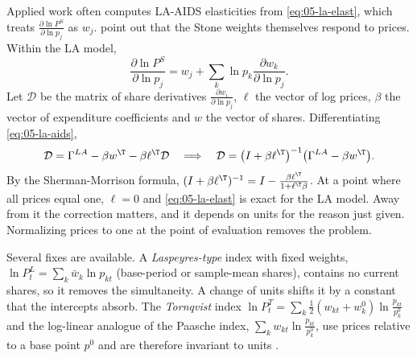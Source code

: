 Applied work often computes LA-AIDS elasticities from \eqref{eq:05-la-elast}, which treats
$\frac{\partial\ln P^S}{\partial\ln p_j}$ as $w_j$. \citet{GreenAlston1990} point out that the Stone
weights themselves respond to prices. Within the LA model,
\begin{equation*}
  \frac{\partial\ln P^S}{\partial\ln p_j} = w_j + \sum_k\ln p_k\frac{\partial w_k}{\partial\ln p_j}.
\end{equation*}
Let $\mathcal{D}$ be the matrix of share derivatives $\frac{\partial w_i}{\partial\ln p_j}$, $\ell$ the vector of
log prices, $\beta$ the vector of expenditure coefficients and $w$ the vector of shares. Differentiating
\eqref{eq:05-la-aids},
\begin{equation*}
  \mathcal{D} = \Gamma^{LA} - \beta w^{\T} - \beta\ell^{\T}\mathcal{D}
  \quad\Longrightarrow\quad
  \mathcal{D} = \bigl(I + \beta\ell^{\T}\bigr)^{-1}\bigl(\Gamma^{LA} - \beta w^{\T}\bigr).
\end{equation*}
By the Sherman-Morrison formula, $(I + \beta\ell^{\T})^{-1} = I - \frac{\beta\ell^{\T}}{1 +
\ell^{\T}\beta}$. At a point where all prices equal one, $\ell = 0$ and \eqref{eq:05-la-elast} is exact for
the LA model. Away from it the correction matters, and it depends on units for the reason just given.
Normalizing prices to one at the point of evaluation removes the problem.

Several fixes are available. A \emph{Laspeyres-type} index with fixed weights, $\ln P_t^L = \sum_k\bar
w_k\ln p_{kt}$ (base-period or sample-mean shares), contains no current shares, so it removes the
simultaneity. A change of units shifts it by a constant that the intercepts absorb. The
\emph{Tornqvist} index $\ln P_t^T = \sum_k\frac{1}{2}(w_{kt} + w_k^0)\ln\frac{p_{kt}}{p_k^0}$ and the
log-linear analogue of the Paasche index, $\sum_k w_{kt}\ln\frac{p_{kt}}{p_k^0}$, use prices relative to a
base point $p^0$ and are therefore invariant to units \citep{Moschini1995}.

